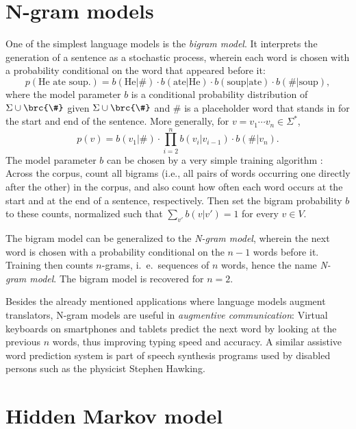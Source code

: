 \section{N-gram models}

One of the simplest language models is the \emph{bigram model}.
\cite{vogler2015} It interprets the generation of a sentence as a stochastic
process, wherein each word is chosen with a probability conditional on the word
that appeared before it:
\[
 p(\text{He ate soup.}) = b(\text{He}|\#) \cdot b(\text{ate}|\text{He}) \cdot b(\text{soup}|\text{ate}) \cdot b(\#|\text{soup}),
\]
where the model parameter $b$ is a conditional probability distribution of
$\Sigma\cup\brc{\#}$ given $\Sigma\cup\brc{\#}$ and $\#$ is a placeholder word
that stands in for the start and end of the sentence. More generally, for $v=v_1\cdots v_n\in\Sigma^*$,
\[
 p(v) = b(v_1|\#) \cdot \prod_{i=2}^n b(v_i|v_{i-1}) \cdot b(\#|v_n).
\]
The model parameter $b$ can be chosen by a very simple training algorithm
\cite[pp.~123]{jm09}: Across the corpus, count all bigrams (i.e., all pairs of
words occurring one directly after the other) in the corpus, and also count how
often each word occurs at the start and at the end of a sentence, respectively.
Then set the bigram probability $b$ to these counts, normalized such that
$\sum_{v'} b(v|v')=1$ for every $v\in V$.

The bigram model can be generalized to the \emph{N-gram model}, wherein the
next word is chosen with a probability conditional on the $n-1$ words before
it. Training then counts $n$-grams, i.~e.~sequences of $n$ words, hence the
name \emph{N-gram model}. The bigram model is recovered for $n=2$.

Besides the already mentioned applications where language models augment
translators, N-gram models are useful in \emph{augmentive communication}:
Virtual keyboards on smartphones and tablets predict the next word by looking
at the previous $n$ words, thus improving typing speed and accuracy.
\cite{hasan2004n} A similar assistive word prediction system is part of speech
synthesis programs used by disabled persons such as the physicist Stephen
Hawking. \cite{newelletal1998}

\section{Hidden Markov model}

